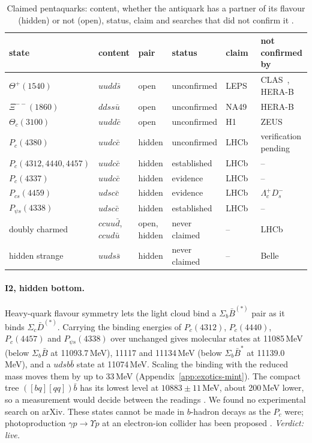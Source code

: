\begin{table}[tbp]\centering\footnotesize\setlength{\tabcolsep}{3.5pt}
\caption{Claimed pentaquarks: content, whether the antiquark has a partner of its flavour (hidden) or not (open), status, claim and
searches that did not confirm it .}
\label{tab:exo-mint}
\begin{tabular}{@{}llllll@{}}
\toprule
state & content & pair & status & claim & not confirmed by \\
\midrule
$\Theta^+(1540)$ & $uudd\bar s$ & open & unconfirmed & LEPS~\cite{nakano2003} & CLAS~\cite{mckinnon2006}, HERA-B~\cite{knoepfle2004} \\
$\Xi^{--}(1860)$ & $ddss\bar u$ & open & unconfirmed & NA49~\cite{na492004} & HERA-B~\cite{knoepfle2004} \\
$\Theta_c(3100)$ & $uudd\bar c$ & open & unconfirmed & H1~\cite{h12004} & ZEUS~\cite{zeus2004} \\
$P_c(4380)$ & $uudc\bar c$ & hidden & unconfirmed & LHCb~\cite{lhcb2015i} & verification pending~\cite{lhcb2019h} \\
$P_c(4312,4440,4457)$ & $uudc\bar c$ & hidden & established & LHCb~\cite{lhcb2019h} & -- \\
$P_c(4337)$ & $uudc\bar c$ & hidden & evidence & LHCb~\cite{lhcb2022j} & -- \\
$P_{cs}(4459)$ & $udsc\bar c$ & hidden & evidence & LHCb~\cite{lhcb2021h} & $\Lambda_c^+D_s^-$~\cite{lhcb2025h} \\
$P_{\psi s}(4338)$ & $udsc\bar c$ & hidden & established & LHCb~\cite{lhcb2023j} & -- \\
\midrule
doubly charmed & $ccuu\bar d$, $ccud\bar u$ & open, hidden & never claimed & -- & LHCb~\cite{lhcb2024h} \\
hidden strange & $uuds\bar s$ & hidden & never claimed & -- & Belle~\cite{belle2017h} \\
\bottomrule
\end{tabular}
\end{table}

\paragraph{I2, hidden bottom.} Heavy-quark flavour symmetry lets the light cloud bind a $\Sigma_b\bar B^{(*)}$ pair as it binds
$\Sigma_c\bar D^{(*)}$. Carrying the binding energies of $P_c(4312)$, $P_c(4440)$, $P_c(4457)$ and $P_{\psi s}(4338)$ over unchanged
gives molecular states at 11085\,MeV (below $\Sigma_b\bar B$ at 11093.7\,MeV), 11117 and 11134\,MeV (below $\Sigma_b\bar B^*$ at
11139.0\,MeV), and a $udsb\bar b$ state at 11074\,MeV. Scaling the binding with the reduced mass moves them by up to 33\,MeV
(Appendix~\ref{app:exotics-mint}). The compact tree $([bq][qq])\bar b$ has its lowest level at $10883\pm11$\,MeV, about 200\,MeV lower,
so a measurement would decide between the readings . We found no experimental search on arXiv. These states cannot be
made in $b$-hadron decays as the $P_c$ were; photoproduction $\gamma p\to\Upsilon p$ at an electron-ion collider has been proposed
\cite{cao2020}. \emph{Verdict: live.}

